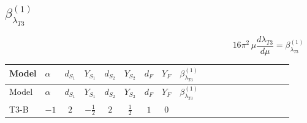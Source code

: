 \documentclass{article}
\begin{document}
\begin{landscape}
\section*{$\beta_{\lambda_{T3}}^{(1)}$}
\[16\pi^2\,\mu\frac{d \lambda_{T3}}{d\mu}=\beta_{\lambda_{T3}}^{(1)}\]
\tiny
\begin{longtable}{@{}llcccccc >{\raggedright\arraybackslash}p{0.54\linewidth}@{}}
\toprule
Model & $\alpha$ & $d_{S_1}$ & $Y_{S_1}$ & $d_{S_2}$ & $Y_{S_2}$ & $d_F$ & $Y_F$ & $\beta_{\lambda_{T3}}^{(1)}$ \\
\midrule
\endfirsthead
\toprule
Model & $\alpha$ & $d_{S_1}$ & $Y_{S_1}$ & $d_{S_2}$ & $Y_{S_2}$ & $d_F$ & $Y_F$ & $\beta_{\lambda_{T3}}^{(1)}$ \\
\midrule
\endhead
T3-B & $-1$ & $2$ & $-\frac{1}{2}$ & $2$ & $\frac{1}{2}$ & $1$ & $0$ & \scriptsize\adjustbox{max width=\linewidth}{$\begin{gathered} {\lambda_{T3}} \left(\operatorname{Tr}\!\left({y_1}\,\left({y_1}\right)^{\dagger}\right)+\operatorname{Tr}\!\left({y_2}\,\left({y_2}\right)^{\dagger}\right)+6 \operatorname{Tr}\!\left({Y_d}\,\left({Y_d}\right)^{\dagger}\right)+2 \operatorname{Tr}\!\left({Y_e}\,\left({Y_e}\right)^{\dagger}\right)+6 \operatorname{Tr}\!\left({Y_u}\,\left({Y_u}\right)^{\dagger}\right)+\frac{{\lambda_{12}^{\rm Adj}}}{6}+\frac{2 {\lambda_{H1}^{\rm Adj}}}{3}+2 {\lambda_{H2}^{\rm Adj}}\right) \\ +2 \left({\lambda_{H^\dagger H^\dagger S_1^\dagger S_1^\dagger}}\right)^{*} \operatorname{Tr}\!\left({y_2}\,\left({y_1}\right)^{\dagger}\right) \\ +2 \left({\lambda_{H^\dagger H^\dagger S_2 S_2}}\right)^{*} \operatorname{Tr}\!\left({y_1}\,\left({y_2}\right)^{\dagger}\right) \\ -4 {\lambda_{H H^\dagger S_1^\dagger S_2^\dagger}^{\rm Cross}} \left({\lambda_{H^\dagger H^\dagger S_1^\dagger S_1^\dagger}}\right)^{*} \\ +4 {\lambda_{S_1 S_1^{\dagger 2}S_2^\dagger}} \left({\lambda_{H^\dagger H^\dagger S_1^\dagger S_1^\dagger}}\right)^{*} \\ +4 \left({\lambda_{H^\dagger H^\dagger S_2 S_2}}\right)^{*} (\left({\lambda_{S_1^\dagger S_2 S_2^{\dagger 2}}}\right)^{*}-\left({\lambda_{H H^\dagger S_1^\dagger S_2^\dagger}^{\rm Cross}}\right)^{*}) \\ -9 {g_2}^2 {\lambda_{T3}} \\ -3 {g_Y}^2 {\lambda_{T3}} \\ +2 {\lambda_{12}} {\lambda_{T3}} \\ +2 {\lambda_H} {\lambda_{T3}} \\ +4 {\lambda_{H1}} {\lambda_{T3}} \\ +4 {\lambda_{H2}} {\lambda_{T3}}\end{gathered}$} \\

\end{longtable}
\end{landscape}
\end{document}
